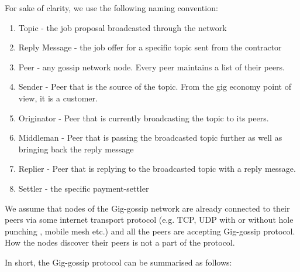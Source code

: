 \documentclass{article}
\begin{document}
For sake of clarity, we use the following naming convention:

\begin{enumerate}
	\item Topic - the job proposal broadcasted through the network
	\item Reply Message - the job offer for a specific topic sent from the contractor
	\item Peer - any gossip network node. Every peer maintains a list of their peers.
	\item Sender - Peer that is the source of the topic. From the gig economy point of view, it is a customer.
	\item Originator - Peer that is currently broadcasting the topic to its peers.
	\item Middleman - Peer that is passing the broadcasted topic further as well as bringing back the reply message
	\item Replier - Peer that is replying to the broadcasted topic with a reply message.
	\item Settler - the specific payment-settler
\end{enumerate}

We assume that nodes of the Gig-gossip network are already connected to their peers via some internet transport protocol (e.g. TCP, UDP with or without hole punching \cite{WebRTC}, mobile mesh etc.) and all the peers are accepting Gig-gossip protocol. How the nodes discover their peers is not a part of the protocol.

In short, the Gig-gossip protocol can be summarised as follows:
\end{document}
